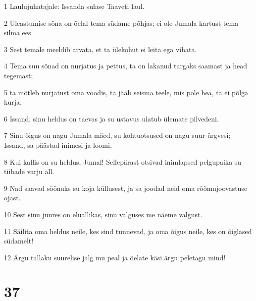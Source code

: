 \par 1 Laulujuhatajale: Issanda sulase Taaveti laul.
\par 2 Üleastumise sõna on õelal tema südame põhjas; ei ole Jumala kartust tema silma ees.
\par 3 Sest temale meeldib arvata, et ta ülekohut ei leita ega vihata.
\par 4 Tema suu sõnad on nurjatus ja pettus, ta on lakanud targaks saamast ja head tegemast;
\par 5 ta mõtleb nurjatust oma voodis, ta jääb seisma teele, mis pole hea, ta ei põlga kurja.
\par 6 Issand, sinu heldus on taevas ja su ustavus ulatub ülemate pilvedeni.
\par 7 Sinu õigus on nagu Jumala mäed, su kohtuotsused on nagu suur ürgvesi; Issand, sa päästad inimesi ja loomi.
\par 8 Kui kallis on su heldus, Jumal! Sellepärast otsivad inimlapsed pelgupaika su tiibade varju all.
\par 9 Nad saavad söönuks su koja küllusest, ja sa joodad neid oma rõõmujoovastuse ojast.
\par 10 Sest sinu juures on eluallikas, sinu valguses me näeme valgust.
\par 11 Säilita oma heldus neile, kes sind tunnevad, ja oma õigus neile, kes on õiglased südamelt!
\par 12 Ärgu tallaku suurelise jalg mu peal ja õelate käsi ärgu peletagu mind!

\chapter{37}

